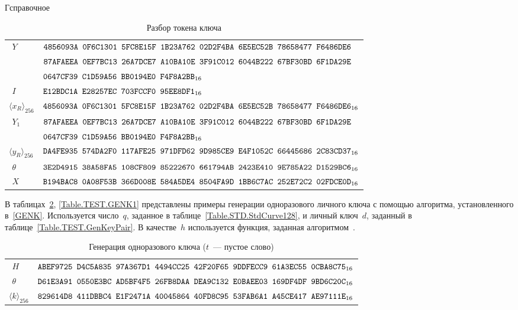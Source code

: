 \begin{appendix}{Г}{справочное}
\begin{table}[!h]
\caption{Разбор токена ключа}\label{Table.TEST.TokenUnwrap}
{\small
\begin{tabular}{|l|l|}
%
\hline
$\phantom{\langle}Y$ & 
$\texttt{4856093A~0F6C1301~5FC8E15F~1B23A762~02D2F4BA~6E5EC52B~78658477~F6486DE6}$\\
&
$\texttt{87AFAEEA~0EF7BC13~26A7DCE7~A10BA10E~3F91C012~6044B222~67BF30BD~6F1DA29E}$\\
&
$\texttt{0647CF39~C1D59A56~BB0194E0~F4F8A2BB}_{16}$\\
%
\hline
$\phantom{\langle}I$ & 
$\texttt{E12BDC1A~E28257EC~703FCCF0~95EE8DF1}_{16}$\\
%
\dhline
$\langle x_R\rangle_{256}$ & 
$\texttt{4856093A~0F6C1301~5FC8E15F~1B23A762~02D2F4BA~6E5EC52B~78658477~F6486DE6}_{16}$\\
%
\hline
$\phantom{\langle}Y_1$ & 
$\texttt{87AFAEEA~0EF7BC13~26A7DCE7~A10BA10E~3F91C012~6044B222~67BF30BD~6F1DA29E}$\\
&
$\texttt{0647CF39~C1D59A56~BB0194E0~F4F8A2BB}_{16}$\\
%
\hline
$\langle y_R\rangle_{256}$ & 
$\texttt{DA4FE935~574DA2F0~117AFE25~971DFD62~9D985CE9~E4F1052C~66445686~2C83CD37}_{16}$\\
%
\hline
$\phantom{\langle}\theta$ & 
$\texttt{3E2D4915~38A58FA5~108CF809~85222670~661794AB~2423E410~9E785A22~D1529BC6}_{16}$\\
\dhline
$\phantom{\langle}X$ & 
$\texttt{B194BAC8~0A08F53B~366D008E~584A5DE4~8504FA9D~1BB6C7AC~252E72C2~02FDCE0D}_{16}$\\
\hline
\end{tabular}
}
\end{table}

\label{TEST.GENK}

В таблицах~\ref{Table.TEST.GENK}, \ref{Table.TEST.GENK1} 
представлены примеры генерации одноразового личного ключа с помощью алгоритма,
установленного в~\ref{GENK}.
%
Используется число~$q$, заданное в таблице~\ref{Table.STD.StdCurve128},
и личный ключ~$d$, заданный в таблице~\ref{Table.TEST.GenKeyPair}.
%
В качестве~$h$ используется функция, заданная алгоритмом~.

\begin{table}[!h]
\caption{Генерация одноразового ключа ($t$~--- пустое слово)}
\label{Table.TEST.GENK}
{\small
\begin{tabular}{|l|l|}
%
\hline
$\phantom{\langle}H$ & 
$\texttt{ABEF9725~D4C5A835~97A367D1~4494CC25~42F20F65~9DDFECC9~61A3EC55~0CBA8C75}_{16}$\\
%
\dhline
$\phantom{\langle}\theta$ & 
$\texttt{D61E3A91~0550E3BC~AD5BF4F5~26FB8DAA~DEA9C132~E0BAEE03~169DF4DF~9BD6C20C}_{16}$\\
%
\dhline
$\langle k\rangle_{256}$ & 
%
$\texttt{829614D8~411DBBC4~E1F2471A~40045864~40FD8C95~53FAB6A1~A45CE417~AE97111E}_{16}$\\
\hline
\end{tabular}
}
\end{table}


\end{appendix}
